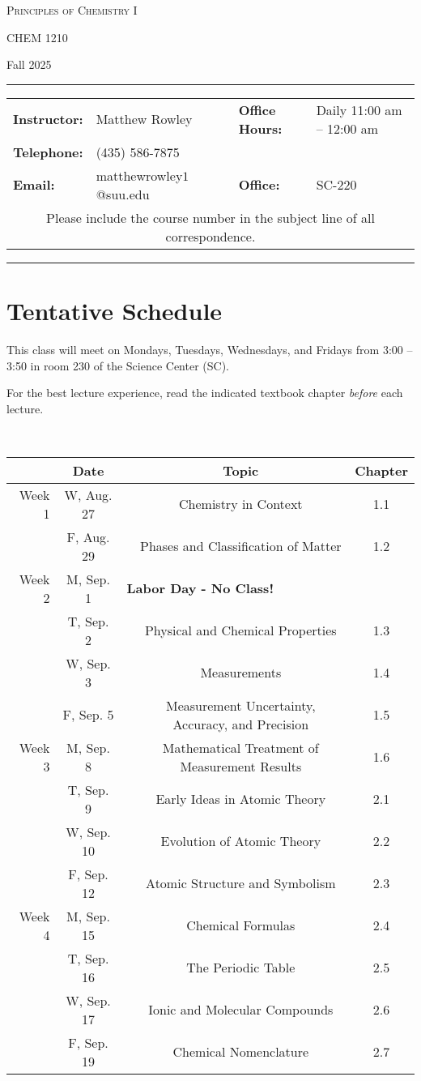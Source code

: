 \documentclass[12pt, letterpaper]{article}
\begin{document}
\begin{center}
	{\Large \textsc{Principles of Chemistry I}}
	
	CHEM 1210
\end{center}

\begin{center}
	{\large Fall 2025}
\end{center}
\begin{center}
	\rule{0.99\textwidth}{0.4pt}
	\begin{tabular}{llcll}
		\textbf{Instructor:} & Matthew Rowley           &  & \textbf{Office Hours:} & Daily 11:00 am -- 12:00 am \\
		\textbf{Telephone:}  & (435) 586-7875           &  &                        &  \\
		\textbf{Email:}      & matthewrowley$1$@suu.edu &  & \textbf{Office:}       & SC-220                   \\
		\multicolumn{5}{c}{Please include the course number in the subject line of all correspondence.}
	\end{tabular}
	\rule{0.99\textwidth}{0.4pt}
\end{center}

\section*{Tentative Schedule}
This class will meet on Mondays, Tuesdays, Wednesdays, and Fridays from 3:00 -- 3:50 in room 230 of the Science Center (SC).

\noindent For the best lecture experience, read the indicated textbook chapter \emph{before} each lecture.

~
\noindent
\begin{tabular}{rcccc}
& Date && Topic & Chapter\\
\midrule
Week 1 & W, Aug. 27&& Chemistry in Context & 1.1\\
& F, Aug. 29&& Phases and Classification of Matter & 1.2\\
\midrule
Week 2 & M, Sep. 1& \multicolumn{3}{l}{\textbf{Labor Day - No Class!}}\\
& T, Sep. 2&& Physical and Chemical Properties & 1.3\\
& W, Sep. 3&& Measurements & 1.4\\
& F, Sep. 5&& Measurement Uncertainty, Accuracy, and Precision & 1.5\\
\midrule
Week 3 & M, Sep. 8&& Mathematical Treatment of Measurement Results & 1.6\\
& T, Sep. 9&& Early Ideas in Atomic Theory & 2.1\\
& W, Sep. 10&& Evolution of Atomic Theory & 2.2\\
& F, Sep. 12&& Atomic Structure and Symbolism & 2.3\\
\midrule
Week 4 & M, Sep. 15&& Chemical Formulas & 2.4\\
& T, Sep. 16&& The Periodic Table & 2.5\\
& W, Sep. 17&& Ionic and Molecular Compounds & 2.6\\
& F, Sep. 19&& Chemical Nomenclature & 2.7\\
\end{tabular}
\end{document}
